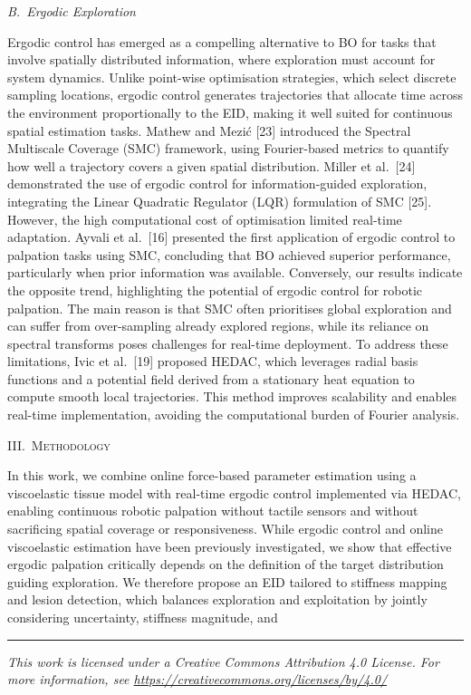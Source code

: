 \documentclass[11pt]{article}
\begin{document}
\vspace{0.4em}

\noindent\textit{B.~Ergodic Exploration}

\vspace{0.2em}

\noindent
Ergodic control has emerged as a compelling alternative to BO for
tasks that involve spatially distributed information, where
exploration must account for system dynamics. Unlike point-wise
optimisation strategies, which select discrete sampling locations,
ergodic control generates trajectories that allocate time across the
environment proportionally to the EID, making it well suited for
continuous spatial estimation tasks. Mathew and Mezi\'{c} [23]
introduced the Spectral Multiscale Coverage (SMC) framework, using
Fourier-based metrics to quantify how well a trajectory covers a
given spatial distribution. Miller et al.\ [24] demonstrated the use
of ergodic control for information-guided exploration, integrating
the Linear Quadratic Regulator (LQR) formulation of SMC [25].
However, the high computational cost of optimisation limited
real-time adaptation. Ayvali et al.\ [16] presented the first
application of ergodic control to palpation tasks using SMC,
concluding that BO achieved superior performance, particularly when
prior information was available. Conversely, our results indicate the
opposite trend, highlighting the potential of ergodic control for
robotic palpation. The main reason is that SMC often prioritises
global exploration and can suffer from over-sampling already explored
regions, while its reliance on spectral transforms poses challenges
for real-time deployment. To address these limitations, Ivic et al.\
[19] proposed HEDAC, which leverages radial basis functions and a
potential field derived from a stationary heat equation to compute
smooth local trajectories. This method improves scalability and
enables real-time implementation, avoiding the computational burden
of Fourier analysis.

\vspace{0.8em}

\begin{center}
\textsc{III.\ Methodology}
\end{center}

\noindent
In this work, we combine online force-based parameter estimation
using a viscoelastic tissue model with real-time ergodic control
implemented via HEDAC, enabling continuous robotic palpation without
tactile sensors and without sacrificing spatial coverage or
responsiveness. While ergodic control and online viscoelastic
estimation have been previously investigated, we show that effective
ergodic palpation critically depends on the definition of the target
distribution guiding exploration. We therefore propose an EID
tailored to stiffness mapping and lesion detection, which balances
exploration and exploitation by jointly considering uncertainty,
stiffness magnitude, and

\vfill
\hrule
\vspace{0.3em}
\begin{center}
{\footnotesize\itshape
This work is licensed under a Creative Commons Attribution 4.0
License. For more information, see
\url{https://creativecommons.org/licenses/by/4.0/}\par}
\end{center}
\end{document}
